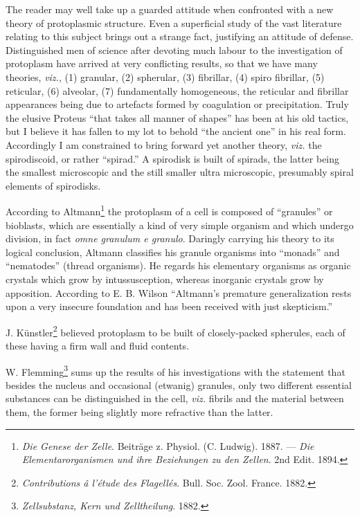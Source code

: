 \documentclass[a4paper, 12pt, oneside, landscape]{article}
\begin{document}
The reader may well take up a guarded attitude when confronted with a new theory of protoplasmic structure. Even a superficial study of the vast literature relating to this subject brings out a strange fact, justifying an attitude of defense. Distinguished men of science after devoting much labour to the investigation of protoplasm have arrived at very conflicting results, so that we have many theories, \emph{viz.}, (1) granular, (2) spherular, (3) fibrillar, (4) spiro fibrillar, (5) reticular, (6) alveolar, (7) fundamentally homogeneous, the reticular and fibrillar appearances being due to artefacts formed by coagulation or precipitation. Truly the elusive Proteus ``that takes all manner of shapes'' has been at his old tactics, but I believe it has fallen to my lot to behold ``the ancient one'' in his real form. Accordingly I am constrained to bring forward yet another theory, \emph{viz.} the spirodiscoid, or rather ``spirad.'' A spirodisk is built of spirads, the latter being the smallest microscopic and the still smaller ultra microscopic, presumably spiral elements of spirodisks.

According to Altmann\footnote{\emph{Die Genese der Zelle}. Beiträge z. Physiol. (C. Ludwig). 1887. --- \emph{Die Elementarorganismen und ihre Beziehungen zu den Zellen}. 2nd Edit. 1894.} the protoplasm of a cell is composed of ``granules'' or bioblasts, which are essentially a kind of very simple organism and which undergo division, in fact \emph{omne granulum e granulo}. Daringly carrying his theory to its logical conclusion, Altmann classifies his granule organisms into ``monads'' and ``nematodes'' (thread organisms). He regards his elementary organisms as organic crystals which grow by intussusception, whereas inorganic crystals grow by apposition. According to E. B. Wilson ``Altmann's premature generalization rests upon a very insecure foundation and has been received with just skepticism.''

J. Künstler\footnote{\emph{Contributions â l'étude des Flagellés}. Bull. Soc. Zool. France. 1882.} believed protoplasm to be built of closely-packed spherules, each of these having a firm wall and fluid contents.

W. Flemming\footnote{\emph{Zellsubstanz, Kern und Zelltheilung}. 1882.} sums up the results of his investigations with the statement that besides the nucleus and occasional (etwanig) granules, only two different essential substances can be distinguished in the cell, \emph{viz.} fibrils and the material between them, the former being slightly more refractive than the latter.
\end{document}

